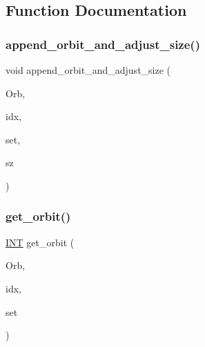 \subsection{Function Documentation}
\mbox{\label{hill_8_c_a1740d8cf43f3d5101704eeca6165ea10}} 
\subsubsection{\texorpdfstring{append\+\_\+orbit\+\_\+and\+\_\+adjust\+\_\+size()}{append\_orbit\_and\_adjust\_size()}}
{\footnotesize\ttfamily void append\+\_\+orbit\+\_\+and\+\_\+adjust\+\_\+size (\begin{DoxyParamCaption}\item[{\mbox{\hyperlink{classschreier}{schreier}} $\ast$}]{Orb,  }\item[{\mbox{\hyperlink{galois_8h_a09fddde158a3a20bd2dcadb609de11dc}{I\+NT}}}]{idx,  }\item[{\mbox{\hyperlink{galois_8h_a09fddde158a3a20bd2dcadb609de11dc}{I\+NT}} $\ast$}]{set,  }\item[{\mbox{\hyperlink{galois_8h_a09fddde158a3a20bd2dcadb609de11dc}{I\+NT}} \&}]{sz }\end{DoxyParamCaption})}

\mbox{\label{hill_8_c_a8f64cd06039ed40b693d54c50274043d}} 
\subsubsection{\texorpdfstring{get\+\_\+orbit()}{get\_orbit()}}
{\footnotesize\ttfamily \mbox{\hyperlink{galois_8h_a09fddde158a3a20bd2dcadb609de11dc}{I\+NT}} get\+\_\+orbit (\begin{DoxyParamCaption}\item[{\mbox{\hyperlink{classschreier}{schreier}} $\ast$}]{Orb,  }\item[{\mbox{\hyperlink{galois_8h_a09fddde158a3a20bd2dcadb609de11dc}{I\+NT}}}]{idx,  }\item[{\mbox{\hyperlink{galois_8h_a09fddde158a3a20bd2dcadb609de11dc}{I\+NT}} $\ast$}]{set }\end{DoxyParamCaption})}

